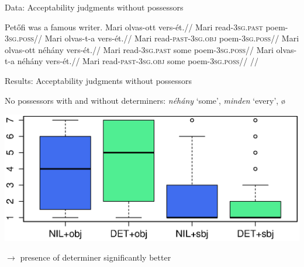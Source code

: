 \documentclass[12pt]{beamer}
\begin{document}
\begin{frame}{Data: Acceptability judgments without possessors}

    \pex Petőfi was a famous writer.
        \a
            \begingl
                \gla    Mari olvas-ott vers-ét.//
                \glb    Mari read-\textsc{3sg.past} poem-\textsc{3sg.poss}//
            \endgl
        \a
            \begingl
                \gla    Mari olvas-t-a vers-ét.//
                \glb    Mari read-\textsc{past-\alert{3sg.obj}} poem-\textsc{3sg.poss}//
            \endgl
        \a
            \begingl
                \gla    Mari olvas-ott néhány vers-ét.//
                \glb    Mari read-\textsc{3sg.past} \textcolor{red!70!black}{some} poem-\textsc{3sg.poss}//
            \endgl
        \a
            \begingl
                \gla    Mari olvas-t-a néhány vers-ét.//
                \glb    Mari read-\textsc{past-\alert{3sg.obj}} \textcolor{red!70!black}{some} poem-\textsc{3sg.poss}//
                \glft   {}//
            \endgl
    \xe

\end{frame}

\begin{frame}{Results: Acceptability judgments without possessors}

    No possessors with and without determiners: \emph{néhány} `some', \emph{minden} `every', ø

    \includegraphics[width=0.9\linewidth]{detagreementcol.eps}

    $\to$ presence of determiner significantly better

\end{frame}
\end{document}
